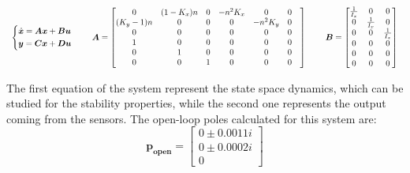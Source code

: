 \begin{equation}
    \begin{tabular}{c c c c c}
        $\begin{dcases}
            \dot{\boldsymbol{x}} = \boldsymbol{Ax} + \boldsymbol{Bu} \\
            \boldsymbol{y}       = \boldsymbol{Cx} + \boldsymbol{Du} \\
        \end{dcases}$
        & &
        $\boldsymbol{A} =
        \begin{bmatrix}
            0 & (1-K_x)n & 0 & -n^2K_x & 0 & 0 & \\   
            (K_y-1)n & 0 & 0 & 0 & -n^2K_y & 0 & \\   
            0 & 0 & 0 & 0 & 0 & 0 & \\   
            1 & 0 & 0 & 0 & 0 & 0 & \\   
            0 & 1 & 0 & 0 & 0 & 0 & \\   
            0 & 0 & 1 & 0 & 0 & 0 &
        \end{bmatrix}$
        & &
        $\boldsymbol{B}=
        \begin{bmatrix}
            \frac{1}{I_x} & 0 & 0 \\
            0 & \frac{1}{I_x} & 0 \\
            0 & 0 & \frac{1}{I_x} \\
            0 & 0 & 0 \\   
            0 & 0 & 0 \\
            0 & 0 & 0
        \end{bmatrix}$
    \end{tabular}
\end{equation}

The first equation of the system represent the state space dynamics, which can be studied for the stability properties, while the second one represents the output coming from the sensors. The open-loop poles calculated for this system are:
\begin{equation}
    \boldsymbol{p_{open}} =
    \begin{bmatrix}
        0 \pm 0.0011i \\   
        0 \pm 0.0002i \\   
        0
    \end{bmatrix}
\end{equation}

